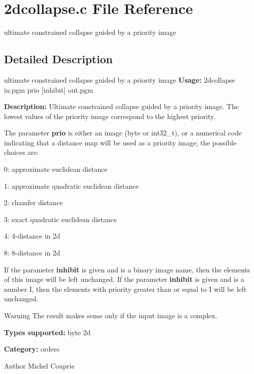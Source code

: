 \section{2dcollapse.c File Reference}
\label{2dcollapse_8c}


ultimate constrained collapse guided by a priority image  




\subsection{Detailed Description}
ultimate constrained collapse guided by a priority image {\bfseries Usage:} 2dcollapse in.pgm prio [inhibit] out.pgm

{\bfseries Description:} Ultimate constrained collapse guided by a priority image. The lowest values of the priority image correspond to the highest priority.

The parameter {\bfseries prio} is either an image (byte or int32\_\-t), or a numerical code indicating that a distance map will be used as a priority image; the possible choices are: \begin{DoxyItemize}
\item 0: approximate euclidean distance \item 1: approximate quadratic euclidean distance \item 2: chamfer distance \item 3: exact quadratic euclidean distance \item 4: 4-\/distance in 2d \item 8: 8-\/distance in 2d\end{DoxyItemize}
If the parameter {\bfseries inhibit} is given and is a binary image name, then the elements of this image will be left unchanged. If the parameter {\bfseries inhibit} is given and is a number I, then the elements with priority greater than or equal to I will be left unchanged.

\begin{DoxyWarning}{Warning}
The result makes sense only if the input image is a complex.
\end{DoxyWarning}
{\bfseries Types supported:} byte 2d

{\bfseries Category:} orders

\begin{DoxyAuthor}{Author}
Michel Couprie 
\end{DoxyAuthor}
